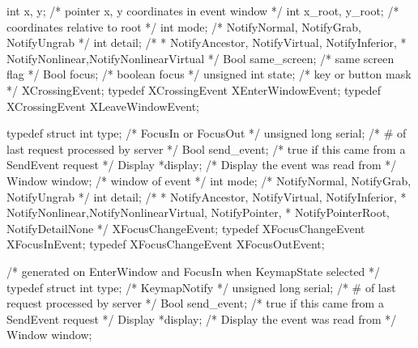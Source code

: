 \documentclass{report}
\begin{document}
\begin{itemize}
\begin{cppcode}
{                    int x, y;               /* pointer x, y coordinates in event window */
                    int x_root, y_root;     /* coordinates relative to root */
                    int mode;               /* NotifyNormal, NotifyGrab, NotifyUngrab */
                    int detail;
                                            /*
                                            * NotifyAncestor, NotifyVirtual, NotifyInferior,
                                            * NotifyNonlinear,NotifyNonlinearVirtual
                                            */
                    Bool same_screen;       /* same screen flag */
                    Bool focus;             /* boolean focus */
                    unsigned int state;     /* key or button mask */
                } XCrossingEvent;
                typedef XCrossingEvent XEnterWindowEvent;
                typedef XCrossingEvent XLeaveWindowEvent;
            \end{cppcode}
           \begin{cppcode}
                typedef struct {
                    int type;               /* FocusIn or FocusOut */
                    unsigned long serial;   /* # of last request processed by server */
                    Bool send_event;        /* true if this came from a SendEvent request */
                    Display *display;       /* Display the event was read from */
                    Window window;          /* window of event */
                    int mode;               /* NotifyNormal, NotifyGrab, NotifyUngrab */
                    int detail;
                    /*
                    * NotifyAncestor, NotifyVirtual, NotifyInferior,
                    * NotifyNonlinear,NotifyNonlinearVirtual, NotifyPointer,
                    * NotifyPointerRoot, NotifyDetailNone
                    */
                } XFocusChangeEvent;
                typedef XFocusChangeEvent XFocusInEvent;
                typedef XFocusChangeEvent XFocusOutEvent;
            \end{cppcode}
            \begin{cppcode}
                /* generated on EnterWindow and FocusIn when KeymapState selected */
                typedef struct {
                    int type;                   /* KeymapNotify */
                    unsigned long serial;       /* # of last request processed by server */
                    Bool send_event;            /* true if this came from a SendEvent request */
                    Display *display;           /* Display the event was read from */
                    Window window;
}
\end{cppcode}
\end{itemize}
\end{document}
